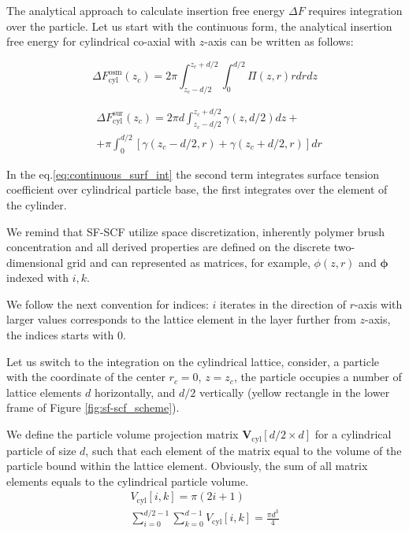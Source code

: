 \documentclass[10pt, a4paper]{article}
\begin{document}
\begin{multicols}{2}
The analytical approach to calculate insertion free energy $\Delta F$ requires integration over the particle.
Let us start with the continuous form, the analytical insertion free energy for cylindrical co-axial with $z$-axis can be written as follows:

\begin{equation}
    \Delta F_{\textrm{cyl}}^{\textrm{osm}}(z_c) = 2 \pi \int_{z_c-d/2}^{z_c+d/2} \int_{0}^{d/2} \Pi(z, r) r dr dz
\end{equation}


\begin{equation}\label{eq:continuous_surf_int}
    \begin{aligned}
        &\Delta F_{\textrm{cyl}}^{\textrm{sur}}(z_c) = 2 \pi d \int_{z_c-d/2}^{z_c+d/2} \gamma(z,d/2) dz +
        \\
        &+ \pi \int_{0}^{d/2} \left[\gamma(z_c-d/2, r) + \gamma(z_c+d/2,r)\right] dr
    \end{aligned}
\end{equation}

In the eq.\ref{eq:continuous_surf_int} the second term integrates surface tension coefficient over cylindrical particle base, the first integrates over the element of the cylinder.

We remind that SF-SCF utilize space discretization, inherently polymer brush concentration and all derived properties are defined on the discrete two-dimensional grid and can represented as matrices, for example, $\phi(z,r)$ and $\bm{\phi}$ indexed with $i,k$.

We follow the next convention for indices: $i$ iterates in the direction of $r$-axis with larger values corresponds to the lattice element in the layer further from $z$-axis, the indices starts with $0$.

Let us switch to the integration on the cylindrical lattice, consider, a particle with the coordinate of the center $r_c=0$, $z = z_{c}$, the particle occupies a number of lattice elements $d$ horizontally, and $d/2$ vertically (yellow rectangle in the lower frame of Figure \ref{fig:sf-scf_scheme}).

We define the particle volume projection matrix $\mathbf{V}_{\textrm{cyl}}[d/2 \times d]$ for a cylindrical particle of size $d$, such that each element of the matrix equal to the volume of the particle bound within the lattice element.
Obviously, the sum of all matrix elements equals to the cylindrical particle volume.
\begin{eqnarray}
    V_{\textrm{cyl}}[i, k] = \pi(2i + 1)
    \\
    \sum_{i=0}^{d/2-1} \sum_{k=0}^{d-1} V_{\textrm{cyl}}[i, k] = \frac{\pi d^3}{4}
\end{eqnarray}


\end{multicols}
\end{document}
